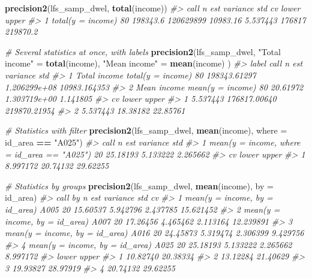 \documentclass[
]{article}
\newenvironment{Shaded}{\begin{snugshade}}{\end{snugshade}}
\newcommand{\AttributeTok}[1]{\textcolor[rgb]{0.13,0.29,0.53}{#1}}
\newcommand{\CommentTok}[1]{\textcolor[rgb]{0.56,0.35,0.01}{\textit{#1}}}
\newcommand{\FunctionTok}[1]{\textcolor[rgb]{0.13,0.29,0.53}{\textbf{#1}}}
\newcommand{\NormalTok}[1]{#1}
\newcommand{\OtherTok}[1]{\textcolor[rgb]{0.56,0.35,0.01}{#1}}
\newcommand{\SpecialCharTok}[1]{\textcolor[rgb]{0.81,0.36,0.00}{\textbf{#1}}}
\newcommand{\StringTok}[1]{\textcolor[rgb]{0.31,0.60,0.02}{#1}}
\begin{document}
\begin{Shaded}
\begin{Highlighting}[]
\FunctionTok{precision2}\NormalTok{(lfs\_samp\_dwel, }\FunctionTok{total}\NormalTok{(income))}
\CommentTok{\#\textgreater{}                call  n      est  variance      std       cv  lower    upper}
\CommentTok{\#\textgreater{} 1 total(y = income) 80 198343.6 120629899 10983.16 5.537443 176817 219870.2}

\CommentTok{\# Several statistics at once, with labels}
\FunctionTok{precision2}\NormalTok{(lfs\_samp\_dwel,}
  \StringTok{"Total income"}  \OtherTok{=} \FunctionTok{total}\NormalTok{(income),}
  \StringTok{"Mean income"}   \OtherTok{=} \FunctionTok{mean}\NormalTok{(income)}
\NormalTok{)}
\CommentTok{\#\textgreater{}          label              call  n          est     variance          std}
\CommentTok{\#\textgreater{} 1 Total income total(y = income) 80 198343.61297 1.206299e+08 10983.164353}
\CommentTok{\#\textgreater{} 2  Mean income  mean(y = income) 80     20.61972 1.303719e+00     1.141805}
\CommentTok{\#\textgreater{}         cv        lower        upper}
\CommentTok{\#\textgreater{} 1 5.537443 176817.00640 219870.21954}
\CommentTok{\#\textgreater{} 2 5.537443     18.38182     22.85761}

\CommentTok{\# Statistics with filter}
\FunctionTok{precision2}\NormalTok{(lfs\_samp\_dwel, }\FunctionTok{mean}\NormalTok{(income), }\AttributeTok{where =}\NormalTok{ id\_area }\SpecialCharTok{==} \StringTok{"A025"}\NormalTok{)}
\CommentTok{\#\textgreater{}                                          call  n      est variance      std}
\CommentTok{\#\textgreater{} 1 mean(y = income, where = id\_area == "A025") 20 25.18193 5.133222 2.265662}
\CommentTok{\#\textgreater{}         cv    lower    upper}
\CommentTok{\#\textgreater{} 1 8.997172 20.74132 29.62255}

\CommentTok{\# Statistics by groups}
\FunctionTok{precision2}\NormalTok{(lfs\_samp\_dwel, }\FunctionTok{mean}\NormalTok{(income), }\AttributeTok{by =}\NormalTok{ id\_area)}
\CommentTok{\#\textgreater{}                             call   by  n      est variance      std        cv}
\CommentTok{\#\textgreater{} 1 mean(y = income, by = id\_area) A005 20 15.60537 5.942796 2.437785 15.621452}
\CommentTok{\#\textgreater{} 2 mean(y = income, by = id\_area) A007 20 17.26456 4.465462 2.113164 12.239891}
\CommentTok{\#\textgreater{} 3 mean(y = income, by = id\_area) A016 20 24.45873 5.319474 2.306399  9.429756}
\CommentTok{\#\textgreater{} 4 mean(y = income, by = id\_area) A025 20 25.18193 5.133222 2.265662  8.997172}
\CommentTok{\#\textgreater{}      lower    upper}
\CommentTok{\#\textgreater{} 1 10.82740 20.38334}
\CommentTok{\#\textgreater{} 2 13.12284 21.40629}
\CommentTok{\#\textgreater{} 3 19.93827 28.97919}
\CommentTok{\#\textgreater{} 4 20.74132 29.62255}
\end{Highlighting}
\end{Shaded}
\end{document}
